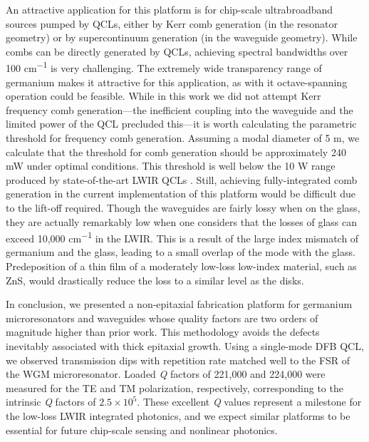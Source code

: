 \documentclass[fleqn,10pt,twocolumn]{wlscirep}
\begin{document}
An attractive application for this platform is for chip-scale ultrabroadband sources pumped by QCLs, either by Kerr comb generation (in the resonator geometry) or by supercontinuum generation (in the waveguide geometry). While combs can be directly generated by QCLs,\cite{hugiMidinfraredFrequencyComb2012,luHighPowerFrequency2015,hillbrandCoherentInjectionLocking2019,mengMidinfraredFrequencyComb2020} achieving spectral bandwidths over 100 \si{cm^{-1}} is very challenging. The extremely wide transparency range of germanium makes it attractive for this application, as with it octave-spanning operation could be feasible. While in this work we did not attempt Kerr frequency comb generation---the inefficient coupling into the waveguide and the limited power of the QCL precluded this---it is worth calculating the parametric threshold for frequency comb generation. Assuming a modal diameter of 5 \micro m, we calculate that the threshold for comb generation should be approximately 240 mW under optimal conditions\cite{xuanHighQSiliconNitride2016}. 
This threshold is well below the 10 W range produced by state-of-the-art LWIR QCLs \cite{zhouHighpowerContinuouswavePhaselocked2019}. Still, achieving fully-integrated comb generation in the current implementation of this platform would be difficult due to the lift-off required. Though the waveguides are fairly lossy when on the glass, they are actually remarkably low when one considers that the losses of glass can exceed 10,000 \si{cm^{-1}} in the LWIR. This is a result of the large index mismatch of germanium and the glass, leading to a small overlap of the mode with the glass. Predeposition of a thin film of a moderately low-loss low-index material, such as ZnS, would drastically reduce the loss to a similar level as the disks. 

In conclusion, we presented a non-epitaxial fabrication platform for germanium microresonators and waveguides whose quality factors are two orders of magnitude higher than prior work. This methodology avoids the defects inevitably associated with thick epitaxial growth. Using a single-mode DFB QCL, we observed transmission dips with repetition rate matched well to the FSR of the WGM microresonator. Loaded \emph{Q} factors of 221,000 and 224,000 were measured for the TE and TM polarization, respectively, corresponding to the intrinsic \emph{Q} factors of $2.5 \times 10^{5}$. These excellent \emph{Q} values represent a milestone for the low-loss LWIR integrated photonics, and we expect similar platforms to be essential for future chip-scale sensing and nonlinear photonics.    
\end{document}
